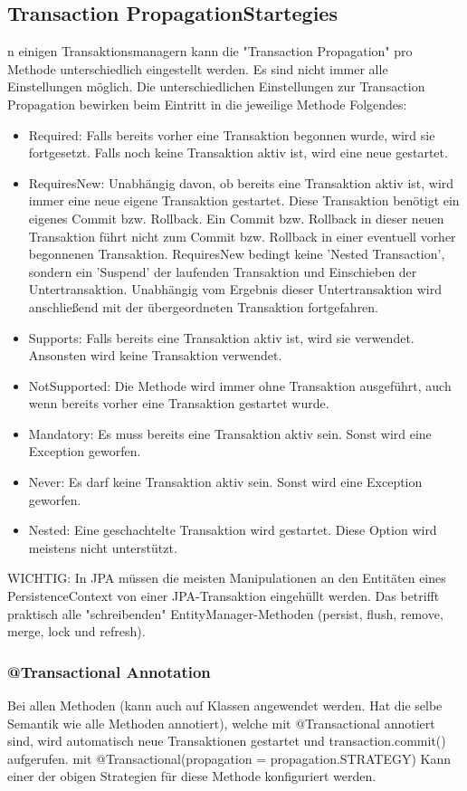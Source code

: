 \documentclass[10pt]{scrartcl}
\begin{document}
\subsection{Transaction PropagationStartegies}
n einigen Transaktionsmanagern kann die "Transaction Propagation" pro Methode unterschiedlich eingestellt werden. Es sind nicht immer alle Einstellungen möglich. Die unterschiedlichen Einstellungen zur Transaction Propagation bewirken beim Eintritt in die jeweilige Methode Folgendes:

\begin{itemize}
	\item Required: Falls bereits vorher eine Transaktion begonnen wurde, wird sie fortgesetzt. Falls noch keine Transaktion aktiv ist, wird eine neue gestartet.
	\item RequiresNew: Unabhängig davon, ob bereits eine Transaktion aktiv ist, wird immer eine neue eigene Transaktion gestartet. Diese Transaktion benötigt ein eigenes Commit bzw. Rollback. Ein Commit bzw. Rollback in dieser neuen Transaktion führt nicht zum Commit bzw. Rollback in einer eventuell vorher begonnenen Transaktion. RequiresNew bedingt keine 'Nested Transaction', sondern ein 'Suspend' der laufenden Transaktion und Einschieben der Untertransaktion. Unabhängig vom Ergebnis dieser Untertransaktion wird anschließend mit der übergeordneten Transaktion fortgefahren.
	\item Supports: Falls bereits eine Transaktion aktiv ist, wird sie verwendet. Ansonsten wird keine Transaktion verwendet.
	\item NotSupported: Die Methode wird immer ohne Transaktion ausgeführt, auch wenn bereits vorher eine Transaktion gestartet wurde.
	\item Mandatory: Es muss bereits eine Transaktion aktiv sein. Sonst wird eine Exception geworfen.
	\item Never: Es darf keine Transaktion aktiv sein. Sonst wird eine Exception geworfen.
	\item Nested: Eine geschachtelte Transaktion wird gestartet. Diese Option wird meistens nicht unterstützt.
\end{itemize}

WICHTIG: In JPA müssen die meisten Manipulationen an den Entitäten eines PersistenceContext von einer JPA-Transaktion eingehüllt werden. Das betrifft praktisch alle "schreibenden" EntityManager-Methoden (persist, flush, remove, merge, lock und refresh).

\subsubsection{@Transactional Annotation}
Bei allen Methoden (kann auch auf Klassen angewendet werden. Hat die selbe Semantik wie alle Methoden annotiert), welche mit @Transactional annotiert sind, wird automatisch neue Transaktionen gestartet und transaction.commit() aufgerufen. mit @Transactional(propagation = propagation.STRATEGY) Kann einer der obigen Strategien für diese Methode konfiguriert werden.
\end{document}
